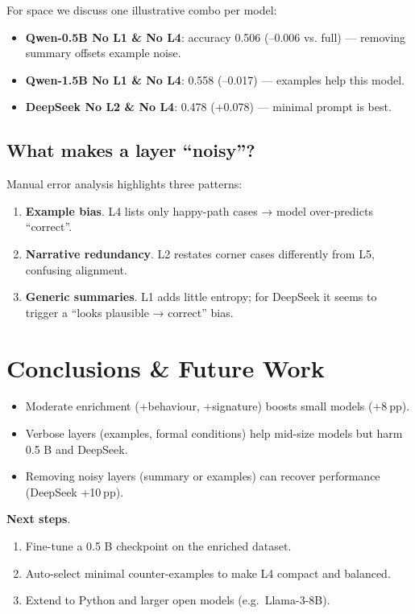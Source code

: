 \documentclass[a4paper]{usiinfbachelorproject}
\begin{document}
For space we discuss one illustrative combo per model:

\begin{itemize}[leftmargin=12pt]
  \item \textbf{Qwen-0.5B No L1 \& No L4}: accuracy 0.506 (–0.006 vs. full) — removing summary offsets example noise.  
  \item \textbf{Qwen-1.5B No L1 \& No L4}: 0.558 (–0.017) — examples help this model.  
  \item \textbf{DeepSeek No L2 \& No L4}: 0.478 (+0.078) — minimal prompt is best.  
\end{itemize}

\subsection{What makes a layer “noisy”?}
Manual error analysis highlights three patterns:

\begin{enumerate}[label=\alph*),leftmargin=15pt,itemsep=0pt]
  \item \textbf{Example bias}.  L4 lists only happy-path cases → model over-predicts “correct”.  
  \item \textbf{Narrative redundancy}.  L2 restates corner cases differently from L5, confusing alignment.  
  \item \textbf{Generic summaries}.  L1 adds little entropy; for DeepSeek it seems to trigger a “looks plausible → correct” bias.
\end{enumerate}

\section{Conclusions \& Future Work}\label{sec:concl}

\begin{itemize}[leftmargin=12pt]
  \item Moderate enrichment (+behaviour, +signature) boosts small models (+8 pp).  
  \item Verbose layers (examples, formal conditions) help mid-size models but harm 0.5 B and DeepSeek.  
  \item Removing noisy layers (summary or examples) can recover performance (DeepSeek +10 pp).  
\end{itemize}

\textbf{Next steps}.  
\begin{enumerate}[label=\arabic*.]
  \item Fine-tune a 0.5 B checkpoint on the enriched dataset.  
  \item Auto-select minimal counter-examples to make L4 compact and balanced.  
  \item Extend to Python and larger open models (e.g.\ Llama-3-8B).  
\end{enumerate}



\end{document}
